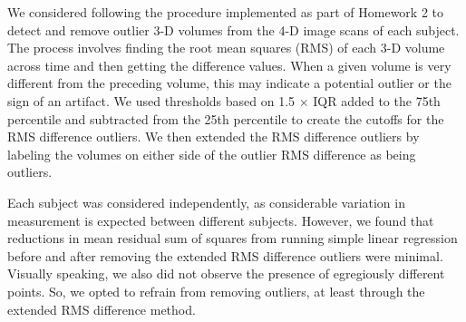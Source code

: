 
\par \indent We considered following the procedure implemented as part of 
Homework 2 to detect and remove outlier 3-D volumes from the 4-D image scans
of each subject. The process involves finding the root mean squares (RMS) of 
each 3-D volume across time and then getting the difference values. When a 
given volume is very different from the preceding volume, this may indicate a 
potential outlier or the sign of an artifact. We used thresholds based on 1.5 
$\times$ IQR added to the 75th percentile and subtracted from the 25th 
percentile to create the cutoffs for the RMS difference outliers. We then 
extended the RMS difference outliers by labeling the volumes on either side of 
the outlier RMS difference as being outliers. 

\par Each subject was considered independently, as considerable variation in 
measurement is expected between different subjects. However, we found that 
reductions in mean residual sum of squares from running simple linear 
regression before and after removing the extended RMS difference outliers were 
minimal. Visually speaking, we also did not observe the presence of egregiously
different points. So, we opted to refrain from removing outliers, at least 
through the extended RMS difference method. 

